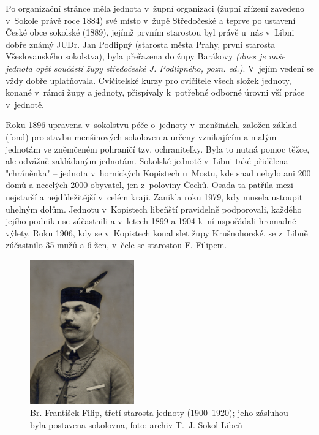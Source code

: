 \documentclass[a5paper, 11pt, twoside]{article}
\newcommand{\pozned}[1]{%
\textit{#1}}
\begin{document}
Po organizační stránce měla jednota v~župní organizaci (župní zřízení zavedeno v~Sokole právě roce 1884) své místo v~župě Středočeské a teprve po ustavení České obce sokolské (1889), jejímž prvním starostou byl právě u~nás v~Libni dobře známý JUDr. Jan Podlipný (starosta města Prahy, první starosta Všeslovanského sokolstva), byla přeřazena do župy Barákovy \pozned{(dnes je naše jednota opět součástí župy středočeské J. Podlipného, pozn. ed.)}. V~jejím vedení se vždy dobře uplatňovala. Cvičitelské kurzy pro cvičitele všech složek jednoty, konané v~rámci župy a jednoty, přispívaly k~potřebné odborné úrovni vší práce v~jednotě.

Roku 1896 upravena v~sokolstvu péče o~jednoty v~menšinách, založen základ (fond) pro stavbu menšinových sokoloven a určeny vznikajícím a malým jednotám ve zněmčeném pohraničí tzv. ochranitelky. Byla to nutná pomoc těžce, ale odvážně zakládaným jednotám. Sokolské jednotě v~Libni také přidělena "chráněnka" – jednota v~hornických Kopistech u~Mostu, kde snad nebylo ani 200 domů a necelých 2000 obyvatel, jen z~poloviny Čechů. Osada ta patřila mezi nejstarší a nejdůležitější v~celém kraji. Zanikla roku 1979, kdy musela ustoupit uhelným dolům. Jednotu v~Kopistech libeňští pravidelně podporovali, každého jejího podniku se zúčastnili a v~letech 1899 a 1904 k~ní uspořádali hromadné výlety. Roku 1906, kdy se v~Kopistech konal slet župy Krušnohorské, se z~Libně zúčastnilo 35 mužů a 6 žen, v~čele se starostou F. Filipem.

\begin{figure}[h!]
  \centering
   \includegraphics[width=0.4\textwidth]{img/07_filip_starosta.jpg}
  \caption*{Br. František Filip, třetí starosta jednoty (1900–⁠⁠⁠⁠⁠⁠1920); jeho zásluhou byla postavena sokolovna, foto: archiv T.~J. Sokol Libeň}
\end{figure}
\end{document}
